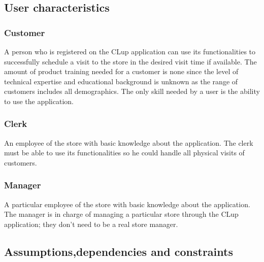 \subsection{User characteristics}


\subsubsection {Customer}
A person who is registered on the CLup application can use its functionalities to successfully schedule a visit to the store in the desired visit time if available.
The amount of product training needed for a customer is none since the level of technical expertise and educational background is unknown as the range of customers includes all demographics.
The only skill needed by a user is the ability to use the application.


\subsubsection {Clerk}
An employee of the store with basic knowledge about the application.
The clerk must be able to use its functionalities so he could handle all physical visits of customers.

\subsubsection {Manager}
A particular employee of the store with basic knowledge about the application.
The manager is in charge of managing a particular store through the CLup application; they don't need to be a real store manager.

\subsection{Assumptions,dependencies and constraints}


